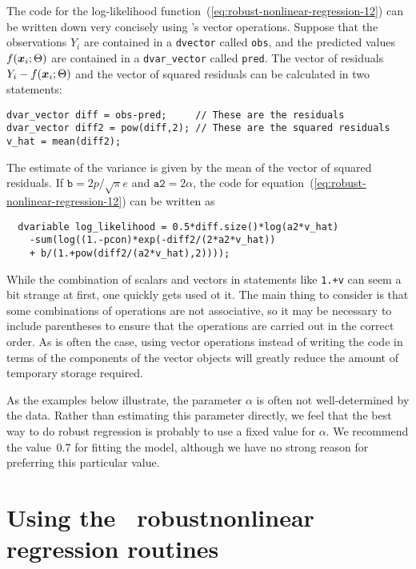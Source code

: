 \documentclass{admbmanual}
\begin{document}
The code for the log-likelihood
function~(\ref{eq:robust-nonlinear-regression-12}) %
can be written down very concisely using \scAD's vector operations. Suppose that
the observations $Y_i$ are contained in a \texttt{dvector} called \texttt{obs},
and the predicted values $f({\mbox{\boldmath $x$}}_i;\Theta)$ are contained in a
\texttt{dvar\_vector} called \texttt{pred}. The vector of residuals $Y_i
-f({\mbox{\boldmath $x$}}_i;\Theta)$ and the vector of squared residuals can be
calculated in two statements:
\begin{lstlisting}
dvar_vector diff = obs-pred;     // These are the residuals
dvar_vector diff2 = pow(diff,2); // These are the squared residuals
v_hat = mean(diff2);
\end{lstlisting}
The estimate of the variance is given by the mean of the vector of squared
residuals. If $\texttt{b}=2p/\sqrt{\pi}e$ and $\texttt{a2}=2\alpha$, the code
for equation~(\ref{eq:robust-nonlinear-regression-12}) %
can be written as
\begin{lstlisting}
  dvariable log_likelihood = 0.5*diff.size()*log(a2*v_hat)
    -sum(log((1.-pcon)*exp(-diff2/(2*a2*v_hat))
    + b/(1.+pow(diff2/(a2*v_hat),2))));
\end{lstlisting}

While the combination of scalars and vectors in statements like \texttt{1.+v}
can seem a bit strange at first, one quickly gets used ot it. The main thing to
consider is that some combinations of operations are not associative, so it may
be necessary to include parentheses to ensure that the operations are carried
out in the correct order. As is often the case, using vector operations instead
of writing the code in terms of the components of the vector objects will
greatly reduce the amount of temporary storage required.

As the examples below illustrate, the parameter $\alpha$ is often not
well-determined by the data. Rather than estimating this parameter directly, we
feel that the best way to do robust regression is probably to use a fixed value
for $\alpha$. We recommend the value~$0.7$ for fitting the model, although we
have no strong reason for preferring this particular value.

\section{Using the \scAD\ robust\br nonlinear regression routines}
\label{sec:using-routines}
\end{document}
